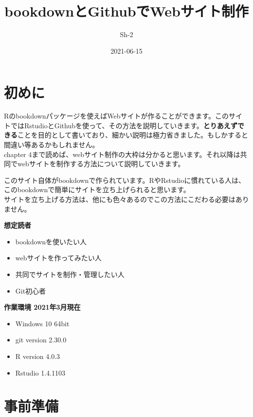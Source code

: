 \documentclass[
]{book}
\title{bookdownとGithubでWebサイト制作}
\author{Sh-2}
\date{2021-06-15}
\providecommand{\tightlist}{%
  \setlength{\itemsep}{0pt}\setlength{\parskip}{0pt}}
\begin{document}
\maketitle

{
\setcounter{tocdepth}{1}
\tableofcontents
}
\hypertarget{ux521dux3081ux306b}{%
\chapter*{初めに}\label{ux521dux3081ux306b}}

Rのbookdownパッケージを使えばWebサイトが作ることができます。このサイトではRstudioとGithubを使って、その方法を説明していきます。\textbf{とりあえずできる}ことを目的として書いており、細かい説明は極力省きました。もしかすると間違い等あるかもしれません。\\
chapter 4まで読めば、webサイト制作の大枠は分かると思います。それ以降は共同でwebサイトを制作する方法について説明していきます。

このサイト自体がbookdownで作られています。RやRstudioに慣れている人は、このbookdownで簡単にサイトを立ち上げられると思います。\\
サイトを立ち上げる方法は、他にも色々あるのでこの方法にこだわる必要はありません。

\textbf{想定読者}

\begin{itemize}
\tightlist
\item
  bookdownを使いたい人
\item
  webサイトを作ってみたい人
\item
  共同でサイトを制作・管理したい人
\item
  Git初心者
\end{itemize}

\textbf{作業環境 2021年3月現在}

\begin{itemize}
\tightlist
\item
  Windows 10 64bit\\
\item
  git version 2.30.0\\
\item
  R version 4.0.3\\
\item
  Rstudio 1.4.1103
\end{itemize}

\hypertarget{ux4e8bux524dux6e96ux5099}{%
\chapter{事前準備}\label{ux4e8bux524dux6e96ux5099}}
\end{document}
